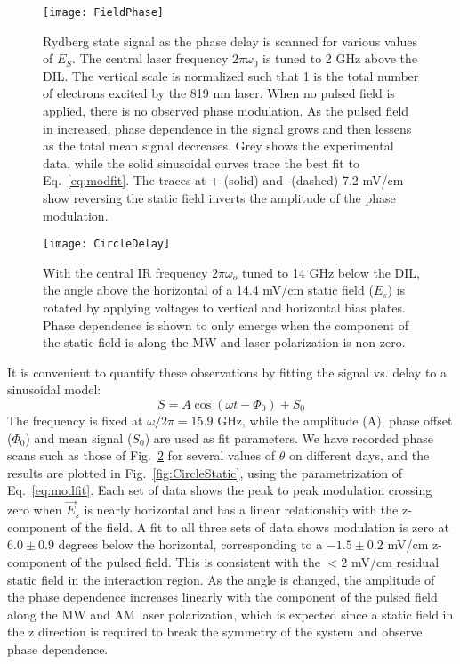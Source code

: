 \documentclass[aps,pra,preprint,groupedaddress]{revtex4-1}
\begin{document}
\begin{figure}
	\texttt{[image: FieldPhase]}
	\caption{Rydberg state signal as the phase delay is scanned for various values of $E_S$. The central laser frequency $2\pi\omega_0$ is tuned to 2 GHz above the DIL. The vertical scale is normalized such that 1 is the total number of electrons excited by the 819 nm laser. When no pulsed field is applied, there is no observed phase modulation. As the pulsed field in increased,  phase dependence in the signal grows and then lessens as the total mean signal decreases. Grey shows the experimental data, while the solid sinusoidal curves trace the best fit to Eq.~\ref{eq:modfit}. The traces at + (solid) and -(dashed) 7.2 mV/cm show reversing the static field inverts the amplitude of the phase modulation.}
	\label{fig:fph}
\end{figure}

\begin{figure}
	\texttt{[image: CircleDelay]}
	\caption{With the central IR frequency $2\pi\omega_o$ tuned to 14 GHz below the DIL, the angle above the horizontal of a 14.4 mV/cm static field ($E_s$) is rotated by applying voltages to vertical and horizontal bias plates. Phase dependence is shown to only emerge when the component of the static field is along the MW and laser polarization is non-zero.}
	\label{fig:CircleDelay}
\end{figure}

It is convenient to quantify these observations by fitting the signal vs. delay to a sinusoidal model:
\begin{equation} \label{eq:modfit}
S = A \cos{(\omega t - \Phi_0)} + S_0
\end{equation}
The frequency is fixed at $\omega/2\pi = 15.9$ GHz, while the amplitude (A), phase offset ($\Phi_0$) and mean signal ($S_0$) are used as fit parameters. We have recorded phase scans such as those of Fig.~\ref{fig:CircleDelay} for several values of $\theta$ on different days, and the results are plotted in Fig.~\ref{fig:CircleStatic}, using the parametrization of Eq.~\ref{eq:modfit}. Each set of data shows the peak to peak modulation crossing zero when $\vec{E}_s$ is nearly horizontal and has a linear relationship with the z-component of the field. A fit to all three sets of data shows modulation is zero at $6.0 \pm 0.9$ degrees below the horizontal, corresponding to a $-1.5 \pm 0.2$ mV/cm z-component of the pulsed field. This is consistent with the $<2$ mV/cm residual static field in the interaction region. As the angle is changed, the amplitude of the phase dependence increases linearly with the component of the pulsed field along the MW and AM laser polarization, which is expected since a static field in the z direction is required to break the symmetry of the system and observe phase dependence.
\end{document}
